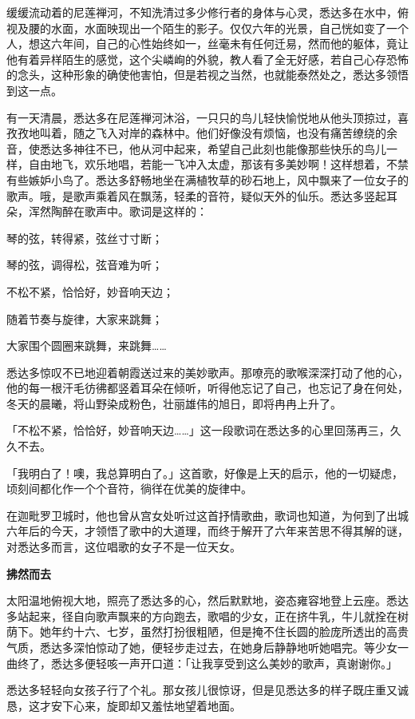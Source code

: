 \documentclass[twoside,openany]{book}
\newcommand{\mt}[1]{\textbullet \textbf{#1}}
\begin{document}
缓缓流动着的尼莲禅河，不知洗清过多少修行者的身体与心灵，悉达多在水中，俯视及腰的水面，水面映现出一个陌生的影子。仅仅六年的光景，自己恍如变了一个人，想这六年间，自己的心性始终如一，丝毫未有任何迁易，然而他的躯体，竟让他有着异样陌生的感觉，这个尖嶙峋的外貌，教人看了全无好感，若自己心存恐怖的念头，这种形象的确使他害怕，但是若视之当然，也就能泰然处之，悉达多领悟到这一点。

有一天清晨，悉达多在尼莲禅河沐浴，一只只的鸟儿轻快愉悦地从他头顶掠过，喜孜孜地叫着，随之飞入对岸的森林中。他们好像没有烦恼，也没有痛苦缭绕的余音，使悉达多神往不已，他从河中起来，希望自己此刻也能像那些快乐的鸟儿一样，自由地飞，欢乐地唱，若能一飞冲入太虚，那该有多美妙啊！这样想着，不禁有些嫉妒小鸟了。悉达多舒畅地坐在满植牧草的砂石地上，风中飘来了一位女子的歌声。哦，是歌声乘着风在飘荡，轻柔的音符，疑似天外的仙乐。悉达多竖起耳朵，浑然陶醉在歌声中。歌词是这样的：

琴的弦，转得紧，弦丝寸寸断；

琴的弦，调得松，弦音难为听；

不松不紧，恰恰好，妙音响天边；

随着节奏与旋律，大家来跳舞；

大家围个圆圈来跳舞，来跳舞……

悉达多惊叹不已地迎着朝霞送过来的美妙歌声。那嘹亮的歌喉深深打动了他的心，他的每一根汗毛彷彿都竖着耳朵在倾听，听得他忘记了自己，也忘记了身在何处，冬天的晨曦，将山野染成粉色，壮丽雄伟的旭日，即将冉冉上升了。

「不松不紧，恰恰好，妙音响天边……」这一段歌词在悉达多的心里回荡再三，久久不去。

「我明白了！噢，我总算明白了。」这首歌，好像是上天的启示，他的一切疑虑，顷刻间都化作一个个音符，徜徉在优美的旋律中。

在迦毗罗卫城时，他也曾从宫女处听过这首抒情歌曲，歌词也知道，为何到了出城六年后的今天，才领悟了歌中的大道理，而终于解开了六年来苦思不得其解的谜，对悉达多而言，这位唱歌的女子不是一位天女。

\mt{拂然而去}

太阳温地俯视大地，照亮了悉达多的心，然后默默地，姿态雍容地登上云座。悉达多站起来，径自向歌声飘来的方向跑去，歌唱的少女，正在挤牛乳，牛儿就拴在树荫下。她年约十六、七岁，虽然打扮很粗陋，但是掩不住长圆的脸庞所透出的高贵气质，悉达多深怕惊动了她，便轻步走过去，在她身后静静地听她唱完。等少女一曲终了，悉达多便轻咳一声开口道：「让我享受到这么美妙的歌声，真谢谢你。」

悉达多轻轻向女孩子行了个礼。那女孩儿很惊讶，但是见悉达多的样子既庄重又诚恳，这才安下心来，旋即却又羞怯地望着地面。
\end{document}
